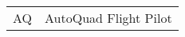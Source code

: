 \begin{table}[H]
\hspace{-9pt}	%
\begin{tabular}{p{} p{}} %
 AQ		&	AutoQuad Flight Pilot
\end{tabular}
\end{table}

